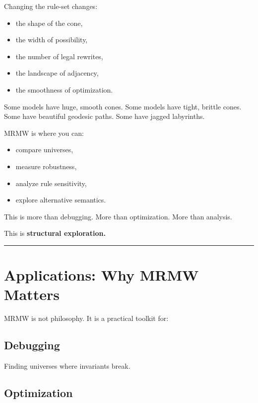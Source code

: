 Changing the rule-set changes:

\begin{itemize}
\tightlist
\item
  the shape of the cone,\\
\item
  the width of possibility,
\item
  the number of legal rewrites,
\item
  the landscape of adjacency,
\item
  the smoothness of optimization.
\end{itemize}

Some models have huge, smooth cones. Some models have tight, brittle
cones. Some have beautiful geodesic paths. Some have jagged labyrinths.

MRMW is where you can:

\begin{itemize}
\tightlist
\item
  compare universes,\\
\item
  measure robustness,
\item
  analyze rule sensitivity,
\item
  explore alternative semantics.
\end{itemize}

This is more than debugging. More than optimization. More than analysis.

This is \textbf{structural exploration.}

\begin{center}\rule{0.5\linewidth}{0.5pt}\end{center}

\section{\texorpdfstring{\textbf{Applications: Why MRMW
Matters}}{8.5 --- Applications: Why MRMW Matters}}\label{applications-why-mrmw-matters}

MRMW is not philosophy. It is a practical toolkit for:

\subsection{\texorpdfstring{\textbf{Debugging}}{Debugging}}\label{debugging}

Finding universes where invariants break.

\subsection{\texorpdfstring{\textbf{Optimization}}{Optimization}}\label{optimization}


